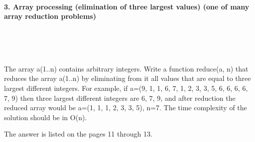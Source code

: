 \documentclass{article}
\begin{document}
\paragraph{}\


	
	\rmfamily
	
	\paragraph{3. Array processing (elimination of three largest values) (one of many array reduction problems) }\
	
	\rmfamily\
	
		The array a(1..n) contains arbitrary integers. Write a function reduce(a, n) that reduces the array a(1..n) by eliminating from it all values that are equal to three largest different integers. For example, if a=(9, 1, 1, 6, 7, 1, 2, 3, 3, 5, 6, 6, 6, 6, 7, 9) then three largest different integers are 6, 7, 9, and after reduction the reduced array would be a=(1, 1, 1, 2, 3, 3, 5), n=7. The time complexity of the solution should be in O(n). 
		\newline
		
		The answer is listed on the pages 11 through 13.
		
	\ttfamily\
	
\paragraph{}\
\paragraph{}\
\paragraph{}\
\paragraph{}\
\paragraph{}\
\paragraph{}\
\paragraph{}\
\paragraph{}\
\end{document}
